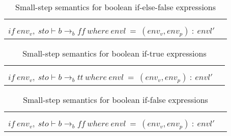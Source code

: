 \begin{table}[H]
    \centering
    \begin{longtable}[c] { r c }
    
    \begin{tabular}{@{}c@{}} 
    [IF-ELSE-FALSE] \\
    \newline
    \end{tabular}
  \begin{tabular}{@{}c@{}}   \(
  \langle if \ {b} \ then \ {S_1} \ else \ {S_2} \ sto, envl\rangle \Rightarrow \langle{S_2},sto,envl\rangle
  \)  \\ \(
  if \ env_v, \ sto \vdash b \rightarrow_b {ff} \ where \ envl \ = \ (env_v, env_p) \ : \ envl' 
  \) 
  \end{tabular}
        
 \end{longtable}
    \caption{Small-step semantics for boolean if-else-false expressions}\label{tab:my_label}
\end{table}

\begin{table}[H]
    \centering
    \begin{longtable}[c] { r c }
    
    \begin{tabular}{@{}c@{}} 
    [IF-TRUE] \\
    \newline
    \end{tabular}
  \begin{tabular}{@{}c@{}}   \(
  \langle if \ {b} \ then \ {S_1} \ sto, envl\rangle \Rightarrow \langle{S_1},sto,envl\rangle
  \)  \\ \(
  if \ env_v, \ sto \vdash b \rightarrow_b {tt} \ where \ envl \ = \ (env_v, env_p) \ : \ envl' 
  \) 
  \end{tabular}
        
 \end{longtable}
    \caption{Small-step semantics for boolean if-true expressions}\label{tab:my_label}
\end{table}

\begin{table}[H]
    \centering
    \begin{longtable}[c] { r c }
    
    \begin{tabular}{@{}c@{}} 
    [IF-FALSE] \\
    \newline
    \end{tabular}
  \begin{tabular}{@{}c@{}}   \(
  \langle if \ {b} \ then \ {S_1} \ sto, envl\rangle \Rightarrow \langle{S_2},sto,envl\rangle
  \)  \\ \(
  if \ env_v, \ sto \vdash b \rightarrow_b {ff} \ where \ envl \ = \ (env_v, env_p) \ : \ envl' 
  \) 
  \end{tabular}
        
 \end{longtable}
    \caption{Small-step semantics for boolean if-false expressions}\label{tab:my_label}
\end{table}

